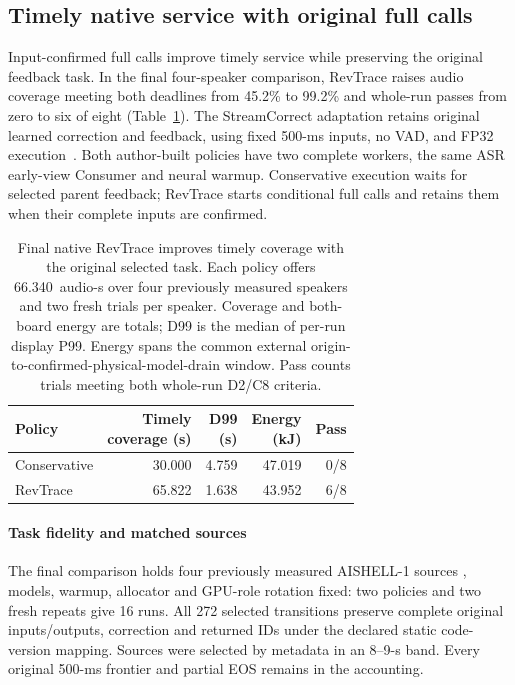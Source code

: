 \subsection{Timely native service with original full calls}
\label{subsec:native_retention_eval}
Input-confirmed full calls improve timely service while preserving the
original feedback task. In the final four-speaker comparison, RevTrace
raises audio coverage meeting both deadlines from 45.2\% to 99.2\% and
whole-run passes from zero to six of eight
(Table~\ref{tab:native_full_confirm}). The StreamCorrect adaptation retains
original learned correction and feedback, using fixed 500-ms inputs,
no VAD, and FP32 execution~\cite{vu2026streamcorrect}. Both author-built
policies have two complete workers, the same ASR early-view Consumer and
neural warmup. Conservative execution waits for selected parent feedback;
RevTrace starts conditional full calls and retains them when their
complete inputs are confirmed.

\begin{table}[t]
\centering
\caption{Final native RevTrace improves timely coverage with the original
selected task. Each policy offers 66.340~audio-s over four previously
measured speakers and two fresh trials per speaker. Coverage and both-board
energy are totals; D99 is the median of per-run display P99. Energy spans
the common external origin-to-confirmed-physical-model-drain window.
Pass counts trials meeting both whole-run D2/C8 criteria.}
\label{tab:native_full_confirm}
\small\setlength{\tabcolsep}{3pt}
\begin{tabular}{@{}lrrrr@{}}
\toprule
Policy & \shortstack{Timely\\coverage (s)} & \shortstack{D99\\(s)} &
\shortstack{Energy\\(kJ)} & Pass\\
\midrule
Conservative & 30.000 & 4.759 & 47.019 & 0/8\\
RevTrace & 65.822 & 1.638 & 43.952 & 6/8\\
\bottomrule
\end{tabular}
\end{table}

\paragraph{Task fidelity and matched sources}
The final comparison holds four previously measured AISHELL-1 sources
\cite{bu2017aishell}, models, warmup, allocator and GPU-role rotation fixed:
two policies and two fresh repeats give 16 runs. All 272 selected
transitions preserve complete original inputs/outputs, correction and
returned IDs under the declared static code-version mapping. Sources
were selected by metadata in an 8--9-s band. Every original 500-ms
frontier and partial EOS remains in the accounting.

